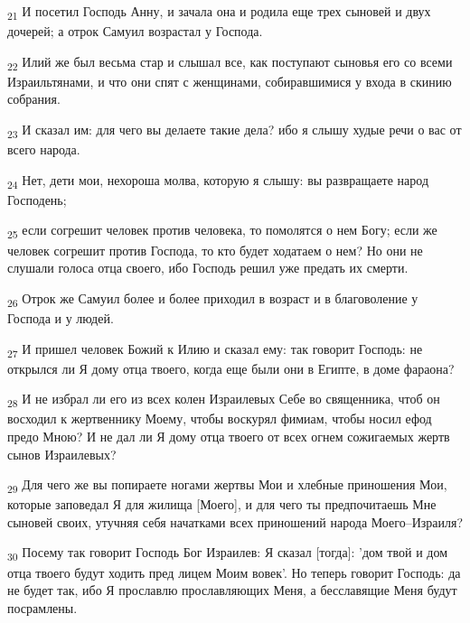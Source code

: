 \begin{tcolorbox}
\textsubscript{21} И посетил Господь Анну, и зачала она и родила еще трех сыновей и двух дочерей; а отрок Самуил возрастал у Господа.
\end{tcolorbox}
\begin{tcolorbox}
\textsubscript{22} Илий же был весьма стар и слышал все, как поступают сыновья его со всеми Израильтянами, и что они спят с женщинами, собиравшимися у входа в скинию собрания.
\end{tcolorbox}
\begin{tcolorbox}
\textsubscript{23} И сказал им: для чего вы делаете такие дела? ибо я слышу худые речи о вас от всего народа.
\end{tcolorbox}
\begin{tcolorbox}
\textsubscript{24} Нет, дети мои, нехороша молва, которую я слышу: вы развращаете народ Господень;
\end{tcolorbox}
\begin{tcolorbox}
\textsubscript{25} если согрешит человек против человека, то помолятся о нем Богу; если же человек согрешит против Господа, то кто будет ходатаем о нем? Но они не слушали голоса отца своего, ибо Господь решил уже предать их смерти.
\end{tcolorbox}
\begin{tcolorbox}
\textsubscript{26} Отрок же Самуил более и более приходил в возраст и в благоволение у Господа и у людей.
\end{tcolorbox}
\begin{tcolorbox}
\textsubscript{27} И пришел человек Божий к Илию и сказал ему: так говорит Господь: не открылся ли Я дому отца твоего, когда еще были они в Египте, в доме фараона?
\end{tcolorbox}
\begin{tcolorbox}
\textsubscript{28} И не избрал ли его из всех колен Израилевых Себе во священника, чтоб он восходил к жертвеннику Моему, чтобы воскурял фимиам, чтобы носил ефод предо Мною? И не дал ли Я дому отца твоего от всех огнем сожигаемых жертв сынов Израилевых?
\end{tcolorbox}
\begin{tcolorbox}
\textsubscript{29} Для чего же вы попираете ногами жертвы Мои и хлебные приношения Мои, которые заповедал Я для жилища [Моего], и для чего ты предпочитаешь Мне сыновей своих, утучняя себя начатками всех приношений народа Моего--Израиля?
\end{tcolorbox}
\begin{tcolorbox}
\textsubscript{30} Посему так говорит Господь Бог Израилев: Я сказал [тогда]: 'дом твой и дом отца твоего будут ходить пред лицем Моим вовек'. Но теперь говорит Господь: да не будет так, ибо Я прославлю прославляющих Меня, а бесславящие Меня будут посрамлены.
\end{tcolorbox}
